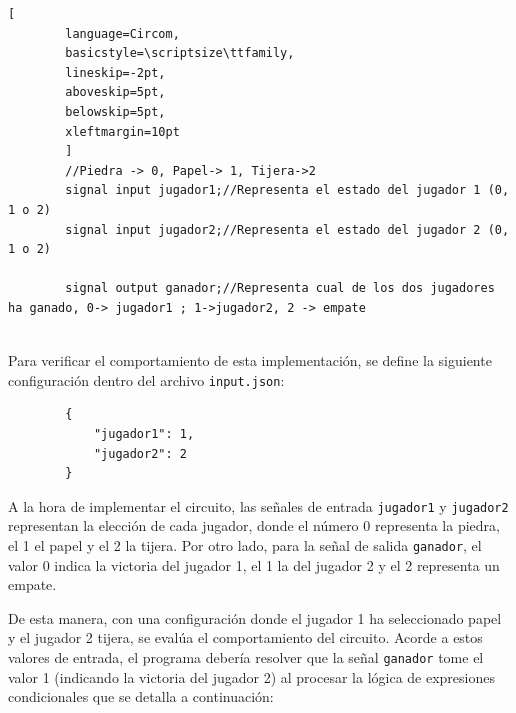 \documentclass[a4paper,12pt]{report}
\begin{document}
	\vspace{0.3cm}
	\begin{lstlisting}[
		language=Circom,
		basicstyle=\scriptsize\ttfamily, 
		lineskip=-2pt,                  
		aboveskip=5pt,                  
		belowskip=5pt,                  
		xleftmargin=10pt
		]
		//Piedra -> 0, Papel-> 1, Tijera->2
		signal input jugador1;//Representa el estado del jugador 1 (0, 1 o 2)
		signal input jugador2;//Representa el estado del jugador 2 (0, 1 o 2)
		
		signal output ganador;//Representa cual de los dos jugadores ha ganado, 0-> jugador1 ; 1->jugador2, 2 -> empate
		
	\end{lstlisting}
	
	\vspace{0.4cm}
	\noindent Para verificar el comportamiento de esta implementación, se define la siguiente configuración dentro del archivo \texttt{input.json}:
	
	\begingroup
	
	\vspace{0.2cm}
	\begin{lstlisting}
		{
			"jugador1": 1,
			"jugador2": 2
		}
	\end{lstlisting}
	
	\endgroup
	
	\vspace{0.2cm}
	\noindent A la hora de implementar el circuito, las señales de entrada \texttt{jugador1} y \texttt{jugador2} representan la elección de cada jugador, donde el número 0 representa la piedra, el 1 el papel y el 2 la tijera. Por otro lado, para la señal de salida \texttt{ganador}, el valor 0 indica la victoria del jugador 1, el 1 la del jugador 2 y el 2 representa un empate. 
	
	
	\vspace{0.3cm}
	\noindent De esta manera, con una configuración donde el jugador 1 ha seleccionado papel y el jugador 2 tijera, se evalúa el comportamiento del circuito. Acorde a estos valores de entrada, el programa debería resolver que la señal \texttt{ganador} tome el valor 1 (indicando la victoria del jugador 2) al procesar la lógica de expresiones condicionales que se detalla a continuación:
	
\end{document}
